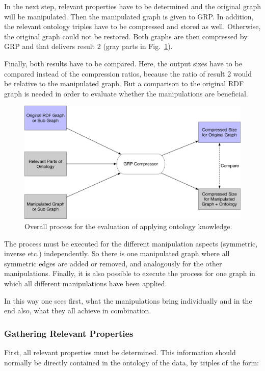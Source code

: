 In the next step, relevant properties have to be determined and the original graph will be manipulated. Then the manipulated graph is given to GRP. In addition, the relevant ontology triples have to be compressed and stored as well. Otherwise, the original graph could not be restored. Both graphs are then compressed by GRP and that delivers result 2 (gray parts in Fig.~\ref{fig:overallprocess}).

Finally, both results have to be compared. Here, the output sizes have to be compared instead of the compression ratios, because the ratio of result 2 would be relative to the manipulated graph. But a comparison to the original RDF graph is needed in order to evaluate whether the manipulations are beneficial.

\begin{figure}
	\centering
	\includegraphics[width=0.9\linewidth]{figures/4_implementation/overallProcess}
	\caption{Overall process for the evaluation of applying ontology knowledge.}
	\label{fig:overallprocess}
\end{figure}

The process must be executed for the different manipulation aspects (symmetric, inverse etc.) independently. So there is one manipulated graph where all symmetric edges are added or removed, and analogously for the other manipulations. Finally, it is also possible to execute the process for one graph in which all different manipulations have been applied. 

In this way one sees first, what the manipulations bring individually and in the end also, what they all achieve in combination.


\subsubsection{Gathering Relevant Properties}
First, all relevant properties must be determined. This information should normally be directly contained in the ontology of the data, by triples of the form:


